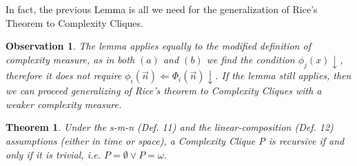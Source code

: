 \documentclass[10pt, a4paper, oneside, titlepage, draft]{article}
\newtheorem{observation}{Observation}[shrd]
\newtheorem{theorem}[shrd]{Theorem}
\begin{document}
In fact, the previous Lemma is all we need for the generalization of Rice's Theorem to Complexity Cliques.

\begin{observation}
    The lemma applies equally to the modified definition of complexity measure, as in both $(a)$ and $(b)$ we find the condition $\phi_j(x)\downarrow$, therefore it does not require $\phi_i(\vec{n}) \Leftarrow \Phi_i(\vec{n})\downarrow$. If the lemma still applies, then we can proceed generalizing of Rice's theorem to Complexity Cliques with a weaker complexity measure.
\end{observation}

\begin{theorem}
    Under the s-m-n (Def. 11) and the linear-composition (Def. 12) assumptions (either in time or space), a Complexity Clique P is recursive if and only if it is trivial, i.e. $P = \emptyset \vee P = \omega$.
\end{theorem}
\end{document}
